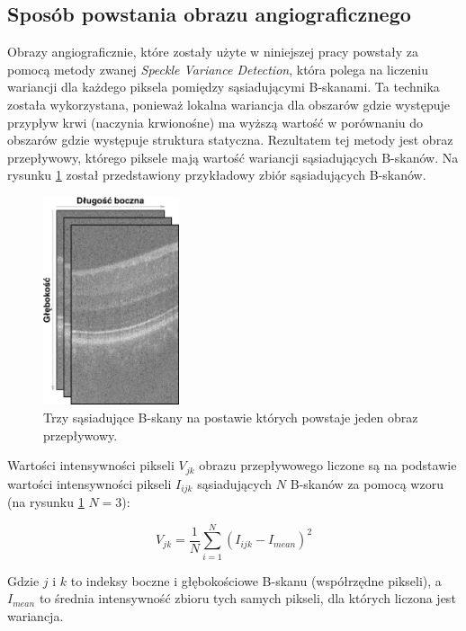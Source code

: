 \subsection{Sposób powstania obrazu angiograficznego}

Obrazy angiograficznie, które zostały użyte w niniejszej pracy powstały za pomocą metody zwanej \textit{Speckle Variance Detection}, która polega na liczeniu wariancji dla każdego piksela pomiędzy sąsiadującymi B-skanami. Ta technika została wykorzystana, ponieważ lokalna wariancja dla obszarów gdzie występuje przypływ krwi (naczynia krwionośne) ma wyższą wartość w porównaniu do obszarów gdzie występuje struktura statyczna. Rezultatem tej metody jest obraz przepływowy, którego piksele mają wartość wariancji sąsiadujących B-skanów. Na rysunku \ref{fig:obrazowanie_oct:speckle_variance} został przedstawiony przykładowy zbiór sąsiadujących B-skanów.

\begin{figure}[H]
	\centering
	\includegraphics[width=4cm]{gfx/speckle_variance}
	\caption{Trzy sąsiadujące B-skany na postawie których powstaje jeden obraz przepływowy.}
	\label{fig:obrazowanie_oct:speckle_variance}
\end{figure}

Wartości intensywności pikseli $V_{jk}$ obrazu przepływowego liczone są na podstawie wartości intensywności pikseli $I_{ijk}$ sąsiadujących $N$ B-skanów za pomocą wzoru (na rysunku \ref{fig:obrazowanie_oct:speckle_variance} $N=3$):

\begin{equation}
V_{jk} = \frac{1}{N} \displaystyle\sum_{i=1}^{N}(I_{ijk} - I_{mean})^2
\end{equation}

Gdzie $j$ i $k$ to indeksy boczne i głębokościowe B-skanu (współrzędne pikseli), a $I_{mean}$ to średnia intensywność zbioru tych samych pikseli, dla których liczona jest wariancja.

